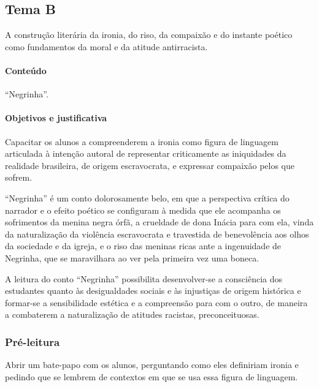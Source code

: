 \documentclass[11pt]{extarticle}
\begin{document}
\subsection{Tema B}

A construção literária da ironia, do riso, da compaixão e do instante
poético como fundamentos da moral e da atitude antirracista.

\paragraph{Conteúdo} ``Negrinha''.

\paragraph{Objetivos e justificativa}
Capacitar os alunos a compreenderem a ironia como figura de linguagem
articulada à intenção autoral de representar criticamente as iniquidades
da realidade brasileira, de origem escravocrata, e expressar compaixão
pelos que sofrem.

``Negrinha'' é um conto dolorosamente belo, em que a perspectiva crítica
do narrador e o efeito poético se configuram à medida que ele acompanha
os sofrimentos da menina negra órfã, a crueldade de dona Inácia para com
ela, vinda da naturalização da violência escravocrata e travestida de
benevolência aos olhos da sociedade e da igreja, e o riso das meninas
ricas ante a ingenuidade de Negrinha, que se maravilhara ao ver pela
primeira vez uma boneca.

A leitura do conto ``Negrinha'' possibilita desenvolver-se a consciência
dos estudantes quanto às desigualdades sociais e às injustiças de origem
histórica e formar-se a sensibilidade estética e a compreensão para com
o outro, de maneira a combaterem a naturalização de atitudes racistas,
preconceituosas.


\subsubsection{Pré-leitura}

Abrir um bate-papo com os alunos, perguntando como eles definiriam
ironia e pedindo que se lembrem de contextos em que se usa essa figura
de linguagem.
\end{document}
